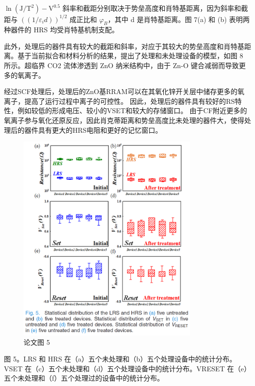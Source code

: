 $\ln \left(\mathrm{J} / \mathrm{T}^2\right)-\mathrm{V}^{0.5}$ 
斜率和截距分别取决于势垒高度和肖特基距离，因为斜率和截距与 $\left(\left(1 / \varepsilon_id\right)\right)^{1 / 2}$ 成正比和 $\varphi_B$，其中 d 是肖特基距离。图 7(a) 和 (b) 表明两种器件的 HRS 均受肖特基机制支配。

此外，处理后的器件具有较大的截距和斜率，对应于其较大的势垒高度和肖特基距离。基于当前拟合和材料分析的结果，提出了处理和未处理设备的模型，如图 8 所示。超临界 CO2 流体渗透到 ZnO 纳米结构中，由于 Zn-O 键合减弱而导致更多的氧离子。

经过SCF处理后，处理后的ZnO基RRAM可以在其氧化锌开关层中储存更多的氧离子，提高了运行过程中离子的可控性。
因此，处理后的器件具有较好的RS特性，例如较低的形成电压、较小的VSET和较大的存储窗口。
由于CF附近更多的氧离子参与氧化还原反应，因此肖克蒂距离和势垒高度比未处理的器件大，使得处理后的器件具有更大的HRS电阻和更好的记忆窗口。







\begin{figure}[htb]
\centering 
\includegraphics[width=0.80\textwidth]{img/c1m5.png} 
\caption{论文图 5}
\label{Test}
\end{figure}
图 5。LRS 和 HRS 在（a）五个未处理和（b）五个处理设备中的统计分布。VSET 在（c）五个未处理和（d）五个处理设备中的统计分布。VRESET 在（e）五个未处理和（f）五个处理过的设备中的统计分布。

